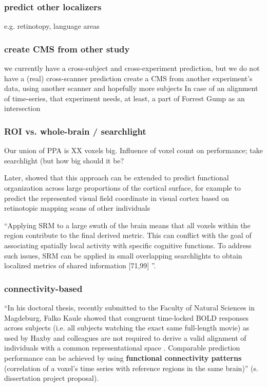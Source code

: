 {\subsubsection{predict other localizers}
%
e.g. retinotopy, language areas


\subsubsection{create CMS from other study}
%
we currently have a cross-subject and cross-experiment prediction,
but we do not have a (real) cross-scanner prediction
%
create a CMS from another experiment’s data,
using another scanner and hopefully more subjects
%
In case of an alignment of time-series,
that experiment needs, at least, a part of Forrest Gump as an intersection


\subsubsection{ROI vs. whole-brain / searchlight}
%
Our union of PPA is XX voxels big.
%
Influence of voxel count on performance; take searchlight (but how big should it
be?

Later, \citet{guntupalli2016model} showed that this approach can be extended to
predict functional organization across large proportions of the cortical
surface, for example to predict the represented visual field coordinate in
visual cortex based on retinotopic mapping scans of other individuals

``Applying SRM to a large swath of the brain means that all voxels within the
region contribute to the final derived metric. This can conflict with the goal
of associating spatially local activity with specific cognitive functions. To
address such issues, SRM can be applied in small overlapping searchlights to
obtain localized metrics of shared information [71,99]
\citep{cohen2017computational}''.


\subsubsection{connectivity-based}


``In his doctoral thesis, recently submitted to the Faculty of Natural Sciences
in Magdeburg, Falko Kaule showed that congruent time-locked BOLD responses
across subjects (i.e. all subjects watching the exact same full-length movie) as
used by Haxby and colleagues are not required to derive a valid alignment of
individuals with a common representational space \citep{kaule2017examination}.
%
Comparable prediction performance can be achieved by using \textbf{functional
connectivity patterns} (correlation of a voxel's time series with reference
regions in the same brain)'' (s. dissertation project proposal).


}
